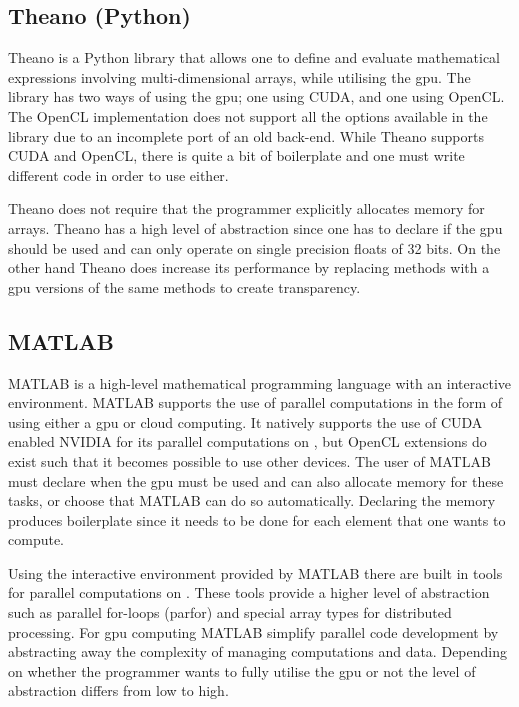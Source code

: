 \subsection{Theano (Python)}
Theano is a Python library that allows one to define and evaluate mathematical expressions involving multi-dimensional arrays, while utilising the \acrshort{gpu}.
The library has two ways of using the \acrshort{gpu}; one using CUDA, and one using OpenCL.
The OpenCL implementation does not support all the options available in the library due to an incomplete port of an old back-end.
While Theano supports CUDA and OpenCL, there is quite a bit of boilerplate and one must write different code in order to use either.

Theano does not require that the programmer explicitly allocates memory for arrays.
Theano has a high level of abstraction since one has to declare if the \acrshort{gpu} should be used and can only operate on single precision floats of 32 bits.
On the other hand Theano does increase its performance by replacing methods with a \acrshort{gpu} versions of the same methods to create transparency. \citep{Theano,Theano_GPU,bergstratheano, LEGB}

\subsection{MATLAB}
MATLAB is a high-level mathematical programming language with an interactive environment.
MATLAB supports the use of parallel computations in the form of using either a \acrshort{gpu} or cloud computing.
It natively supports the use of CUDA enabled NVIDIA  for its parallel computations on , but OpenCL extensions do exist such that it becomes possible to use other devices.
The user of MATLAB must declare when the \acrshort{gpu} must be used and can also allocate memory for these tasks, or choose that MATLAB can do so automatically.
Declaring the memory produces boilerplate since it needs to be done for each element that one wants to compute. \citep{MATLAB_backend,MATLAB_benchmark}

Using the interactive environment provided by MATLAB there are built in tools for parallel computations on .
These tools provide a higher level of abstraction such as parallel for-loops (parfor) and special array types for distributed processing.
For \acrshort{gpu} computing MATLAB simplify parallel code development by abstracting away the complexity of managing computations and data. \citep{MATLAB_parallel}
Depending on whether the programmer wants to fully utilise the \acrshort{gpu} or not the level of abstraction differs from low to high.

